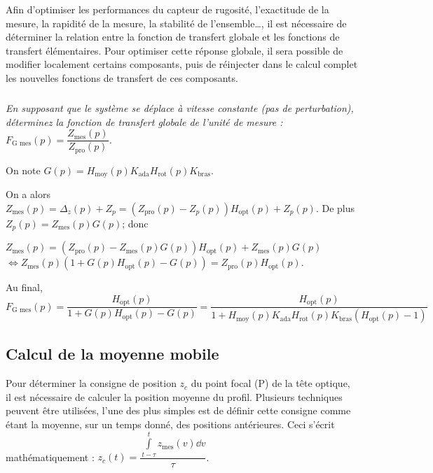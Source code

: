 Afin d’optimiser les performances du capteur de rugosité, l’exactitude de la mesure, la rapidité de la
mesure, la stabilité de l’ensemble…, il est nécessaire de déterminer la relation entre la fonction de transfert
globale et les fonctions de transfert élémentaires. Pour optimiser cette réponse globale, il sera possible de
modifier localement certains composants, puis de réinjecter dans le calcul complet les nouvelles fonctions
de transfert de ces composants.
\subparagraph{\label{q_08}}\textit{ En supposant que le système se déplace à vitesse constante (pas de perturbation), déterminez la fonction de transfert globale de l’unité de mesure : $F_{\text{G mes}}(p)=\dfrac{Z_{\text{mes}}(p)}{Z_{\text{pro}}(p)}$.}
\ifprof
\begin{corrige}
On note $G(p)=H_{\text{moy}}(p) K_{\text{ada}} H_{\text{rot}}(p) K_{\text{bras}}$.

On a alors $Z_{\text{mes}}(p)=\Delta_z(p)+Z_p = \left( Z_{\text{pro}}(p) -Z_p(p)\right)  H_{\text{opt}}(p)+Z_p(p)$.
De plus $Z_p (p)= Z_{\text{mes}}(p) G(p)$; donc 

$Z_{\text{mes}}(p)=  \left( Z_{\text{pro}}(p) - Z_{\text{mes}}(p) G(p)\right)  H_{\text{opt}}(p)+ Z_{\text{mes}}(p) G(p)$ 
$\Leftrightarrow Z_{\text{mes}}(p) \left(1+G(p) H_{\text{opt}}(p) - G(p) \right)=   Z_{\text{pro}}(p)  H_{\text{opt}}(p)$. 

Au final,  $F_{\text{G mes}}(p)=\dfrac{H_{\text{opt}}(p)}{1+G(p) H_{\text{opt}}(p) - G(p)} = 
\dfrac{H_{\text{opt}}(p)}{1+H_{\text{moy}}(p) K_{\text{ada}} H_{\text{rot}}(p) K_{\text{bras}}\left( H_{\text{opt}}(p) - 1\right)}$

\end{corrige}
\else
\fi

\subsection{Calcul de la moyenne mobile}

Pour déterminer la consigne de position $z_c$ du point focal (P) de la tête optique, il est nécessaire de
calculer la position moyenne du profil. Plusieurs techniques peuvent être utilisées, l’une des plus simples
est de définir cette consigne comme étant la moyenne, sur un temps donné, des positions antérieures. Ceci
s’écrit mathématiquement : $z_c(t)=\dfrac{\int\limits_{t-\tau}^{t}z_{\text{mes}}(v)\dd v}{\tau}$.



